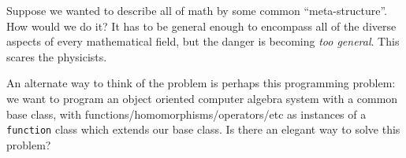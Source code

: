 \begin{prob}
Suppose we wanted to describe all of math by some common
``meta-structure''. How would we do it? It has to be general enough to
encompass all of the diverse aspects of every mathematical field,
but the danger is becoming \emph{too general}. This scares the
physicists. 

An alternate way to think of the problem is perhaps
this programming problem: we want to program an object oriented
computer algebra system with a common base class, with
functions/homomorphisms/operators/etc as instances of a 
{\tt function} class which extends our base class. Is there an
elegant way to solve this problem?
\end{prob}

